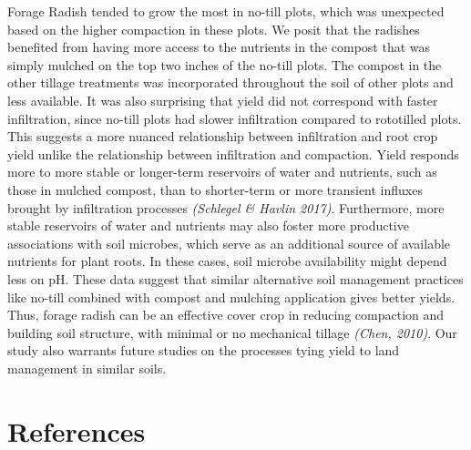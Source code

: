 \documentclass[
]{article}
\begin{document}
Forage Radish tended to grow the most in no-till plots, which was unexpected based on the higher compaction in these plots.
We posit that the radishes benefited from having more access to the nutrients in the compost that was simply mulched on the top two inches of the no-till plots.
The compost in the other tillage treatments was incorporated throughout the soil of other plots and less available.
It was also surprising that yield did not correspond with faster infiltration, since no-till plots had slower infiltration compared to rototilled plots.
This suggests a more nuanced relationship between infiltration and root crop yield unlike the relationship between infiltration and compaction.
Yield responds more to more stable or longer-term reservoirs of water and nutrients, such as those in mulched compost, than to shorter-term or more transient influxes brought by infiltration processes \emph{(Schlegel \& Havlin 2017)}.
Furthermore, more stable reservoirs of water and nutrients may also foster more productive associations with soil microbes, which serve as an additional source of available nutrients for plant roots.
In these cases, soil microbe availability might depend less on pH.
These data suggest that similar alternative soil management practices like no-till combined with compost and mulching application gives better yields.
Thus, forage radish can be an effective cover crop in reducing compaction and building soil structure, with minimal or no mechanical tillage \emph{(Chen, 2010)}.
Our study also warrants future studies on the processes tying yield to land management in similar soils.

\newpage

\hypertarget{references}{%
\section*{References}\label{references}}
\end{document}
